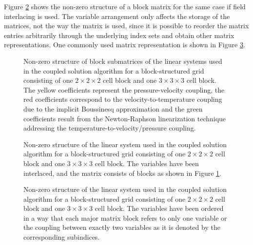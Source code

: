 Figure \ref{fig:interlacemat} shows the non-zero structure of a block matrix for the same case if field interlacing is used. The variable arrangement only affects the storage of the matrices, not the way the matrix is used, since it is possible to reorder the matrix entries arbitrarily through the underlying index sets and obtain other matrix representations. One commonly used matrix representation is shown in Figure \ref{fig:nointerlacemat}.

\begin{figure}
  \centering
  
  \caption{Non-zero structure of block submatrices of the linear systems used in the coupled solution algorithm for a block-structured grid consisting of one $2\times2\times2$ cell block and one $3\times3\times3$ cell block. The yellow coefficients represent the pressure-velocity coupling, the red coefficients correspond to the velocity-to-temperature coupling due to the implicit Boussinesq approximation and the green coefficients result from the Newton-Raphson linearization technique addressing the temperature-to-velocity/pressure coupling.}
  \label{fig:cpldassemble}
\end{figure}

\begin{figure}
  \centering
  
  \caption{Non-zero structure of the linear system used in the coupled solution algorithm for a block-structured grid consisting of one $2\times2\times2$ cell block and one $3\times3\times3$ cell block. The variables have been interlaced, and the matrix consists of blocks as shown in Figure \ref{fig:cpldassemble}.}
  \label{fig:interlacemat}
\end{figure}

\begin{figure}
  \centering
   
  \caption{Non-zero structure of the linear system used in the coupled solution algorithm for a block-structured grid consisting of one $2\times2\times2$ cell block and one $3\times3\times3$ cell block. The variables have been ordered in a way that each major matrix block refers to only one variable or the coupling between exactly two variables as it is denoted by the corresponding subindices.}
  \label{fig:nointerlacemat}
\end{figure}
